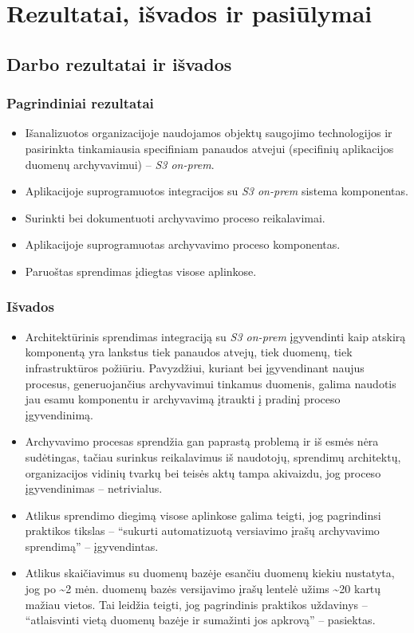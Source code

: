 \section{Rezultatai, išvados ir pasiūlymai}

\subsection{Darbo rezultatai ir išvados}

\subsubsection*{Pagrindiniai rezultatai}

\begin{itemize}
    \item Išanalizuotos organizacijoje naudojamos objektų saugojimo technologijos ir pasirinkta tinkamiausia specifiniam panaudos atvejui (specifinių aplikacijos duomenų archyvavimui) -- \textit{S3 on-prem}.
    \item Aplikacijoje suprogramuotos integracijos su \textit{S3 on-prem} sistema komponentas.
    \item Surinkti bei dokumentuoti archyvavimo proceso reikalavimai.
    \item Aplikacijoje suprogramuotas archyvavimo proceso komponentas.
    \item Paruoštas sprendimas įdiegtas visose aplinkose.
\end{itemize}

\subsubsection*{Išvados}

\begin{itemize}
    \item Architektūrinis sprendimas integraciją su \textit{S3 on-prem} įgyvendinti kaip atskirą komponentą yra lankstus tiek panaudos atvejų, tiek duomenų, tiek infrastruktūros požiūriu. Pavyzdžiui, kuriant bei įgyvendinant naujus procesus, generuojančius archyvavimui tinkamus duomenis, galima naudotis jau esamu komponentu ir archyvavimą įtraukti į pradinį proceso įgyvendinimą.
    \item Archyvavimo procesas sprendžia gan paprastą problemą ir iš esmės nėra sudėtingas, tačiau surinkus reikalavimus iš naudotojų, sprendimų architektų, organizacijos vidinių tvarkų bei teisės aktų tampa akivaizdu, jog proceso įgyvendinimas -- netrivialus.
    \item Atlikus sprendimo diegimą visose aplinkose galima teigti, jog pagrindinsi praktikos tikslas -- \enquote{sukurti automatizuotą versiavimo įrašų archyvavimo sprendimą} -- įgyvendintas.
    \item Atlikus skaičiavimus su duomenų bazėje esančiu duomenų kiekiu nustatyta, jog po \sim  2 mėn. duomenų bazės versijavimo įrašų lentelė užims \sim 20 kartų mažiau vietos. Tai leidžia teigti, jog pagrindinis praktikos uždavinys -- \enquote{atlaisvinti vietą duomenų bazėje ir sumažinti jos apkrovą} -- pasiektas.
\end{itemize}

